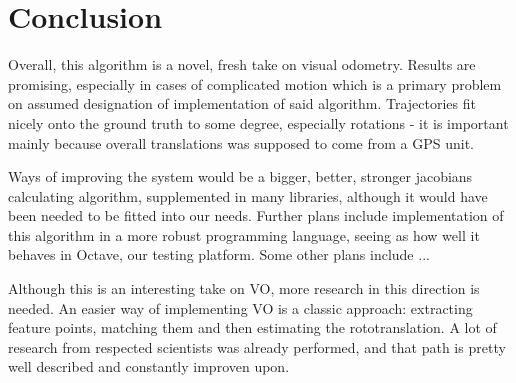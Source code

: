 \chapter{Conclusion}

Overall, this algorithm is a novel, fresh take on visual odometry. Results are promising, especially in cases of complicated motion which is a primary problem on assumed designation of implementation of said algorithm. Trajectories fit nicely onto the ground truth to some degree, especially rotations - it is important mainly because overall translations was supposed to come from a GPS unit.

Ways of improving the system would be a bigger, better, stronger jacobians calculating algorithm, supplemented in many libraries, although it would have been needed to be fitted into our needs. Further plans include implementation of this algorithm in a more robust programming language, seeing as how well it behaves in Octave, our testing platform. Some other plans include ...

Although this is an interesting take on VO, more research in this direction is needed. An easier way of implementing VO is a classic approach: extracting feature points, matching them and then estimating the rototranslation. A lot of research from respected scientists was already performed, and that path is pretty well described and constantly improven upon.



